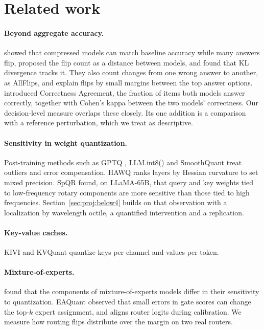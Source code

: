\documentclass[10pt]{article}
\begin{document}
\section{Related work}\label{sec:related}

\paragraph{Beyond aggregate accuracy.} \citet{dutta2024accuracy} showed that compressed models
can match baseline accuracy while many answers flip, proposed the flip count as a distance
between models, and found that KL divergence tracks it. They also count changes from one wrong
answer to another, as AllFlips, and explain flips by small margins between the top answer
options. \citet{rababah2026illusion} introduced Correctness Agreement, the fraction of items
both models answer correctly, together with Cohen's kappa between the two models'
correctness. Our decision-level measure overlaps these closely. Its one addition is a
comparison with a reference perturbation, which we treat as descriptive.

\paragraph{Sensitivity in weight quantization.} Post-training methods such as GPTQ
\citep{frantar2023gptq}, LLM.int8() \citep{dettmers2022llmint8} and SmoothQuant
\citep{xiao2023smoothquant} treat outliers and error compensation. HAWQ
\citep{dong2019hawq,dong2020hawqv2} ranks layers by Hessian curvature to set mixed precision.
SpQR \citep{dettmers2024spqr} found, on LLaMA-65B, that query and key weights tied to
low-frequency rotary components \citep{su2024roformer} are more sensitive than those tied to
high frequencies. Section~\ref{sec:proj:below4} builds on that observation with a localization
by wavelength octile, a quantified intervention and a replication.

\paragraph{Key-value caches.} KIVI \citep{liu2024kivi} and KVQuant \citep{hooper2024kvquant}
quantize keys per channel and values per token.

\paragraph{Mixture-of-experts.} \citet{li2024quantmoebench} found that the components of
mixture-of-experts models differ in their sensitivity to quantization. EAQuant
\citep{fu2025eaquant} observed that small errors in gate scores can change the top-$k$ expert
assignment, and aligns router logits during calibration. We measure how routing flips
distribute over the margin on two real routers.
\end{document}
